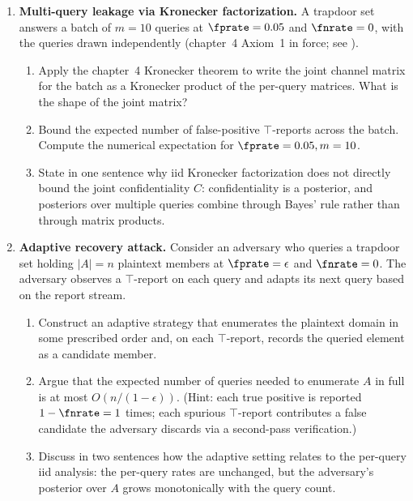 \begin{enumerate}
\item \exstarstar
\label{ex:ch17-4}
\textbf{Multi-query leakage via Kronecker factorization.}
A trapdoor set answers a batch of $m = 10$ queries at
$\fprate = 0.05$ and $\fnrate = 0$, with the queries drawn
independently (chapter~4 Axiom~1 in force; see
).
\begin{enumerate}
  \item[(a)] Apply the chapter~4 Kronecker theorem
     to write the joint channel matrix for
    the batch as a Kronecker product of the per-query matrices.
    What is the shape of the joint matrix?
  \item[(b)] Bound the expected number of false-positive
    $\top$-reports across the batch. Compute the numerical
    expectation for $\fprate = 0.05, m = 10$.
  \item[(c)] State in one sentence why iid Kronecker
    factorization does not directly bound the joint
    confidentiality $C$: confidentiality is a posterior, and
    posteriors over multiple queries combine through Bayes'
    rule rather than through matrix products.
\end{enumerate}

\item \exstarstar
\label{ex:ch17-5}
\textbf{Adaptive recovery attack.}
Consider an adversary who queries a trapdoor set holding $|A| = n$
plaintext members at $\fprate = \epsilon$ and $\fnrate = 0$. The
adversary observes a $\top$-report on each query and adapts its
next query based on the report stream.
\begin{enumerate}
  \item[(a)] Construct an adaptive strategy that enumerates the
    plaintext domain in some prescribed order and, on each
    $\top$-report, records the queried element as a candidate
    member.
  \item[(b)] Argue that the expected number of queries needed to
    enumerate $A$ in full is at most $O(n / (1 - \epsilon))$.
    (Hint: each true positive is reported $1 - \fnrate = 1$
    times; each spurious $\top$-report contributes a false
    candidate the adversary discards via a second-pass
    verification.)
  \item[(c)] Discuss in two sentences how the adaptive setting
    relates to the per-query iid analysis: the per-query rates
    are unchanged, but the adversary's posterior over $A$
    grows monotonically with the query count.
\end{enumerate}


\end{enumerate}
